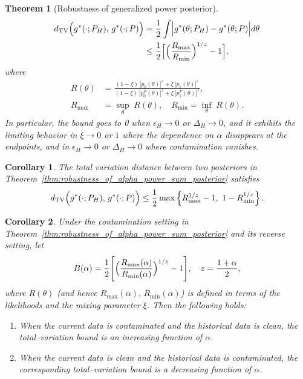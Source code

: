 \documentclass[12pt]{article}
\newtheorem{theorem}{Theorem}
\newtheorem{corollary}{Corollary}
\begin{document}
\begin{theorem}[Robustness of generalized power posterior]
    \begin{align*}
        d_{\mathrm{TV}}\Bigl(g^*(\cdot;P_H),\,g^*(\cdot;P)\Bigr) &= \frac{1}{2}\int\Bigl| g^*(\theta;P_H) - g^*(\theta;P) \Bigr| d\theta \nonumber \\
        &\leq \frac{1}{2}\Bigl[\Bigl(\frac{R_{\max}}{R_{\min}}\Bigr)^{1/z} - 1 \Bigr],
    \end{align*}
    where
    \begin{align*}
        R(\theta) &=  \frac{(1-\xi)\,\bigl[p_0(\theta)\bigr]^z + \xi\,\bigl[p_1(\theta)\bigr]^z}{(1-\xi)\,\bigl[p_0^F(\theta)\bigr]^z +  \xi\,\bigl[p_1^F(\theta)\bigr]^z}, \\
        R_{\max} &= \sup_{\theta}\;R(\theta), \quad R_{\min} = \inf_{\theta}\;R(\theta).
    \end{align*}
    In particular, the bound goes to 0 when $\epsilon_H\to0$ or $\Delta_H\to0$, and it exhibits the limiting behavior in $\xi\to0$ or $1$ where the dependence on $\alpha$ disappears at the endpoints, and in $\epsilon_H\to0$ or $\Delta_H\to0$ where contamination vanishes.
\end{theorem}
\begin{corollary}
    The total variation distance between two posteriors in Theorem~\ref{thm:robustness_of_alpha_power_sum_posterior} satisfies
    \begin{align*}
        d_{\mathrm{TV}}\Bigl(g^*(\cdot;P_H),\,g^*(\cdot;P)\Bigr) \leq \frac{1}{2}\max\left\{R_{\max}^{1/z} - 1,\ 1 - R_{\min}^{1/z}\right\}.
    \end{align*}
\end{corollary}
\begin{corollary}
    \label{cor:contamination_alpha}
    Under the contamination setting in Theorem~\ref{thm:robustness_of_alpha_power_sum_posterior} and its reverse setting, let
    \begin{align*}
        B(\alpha)=\frac{1}{2}\Biggl[\Bigl(\frac{R_{\max}(\alpha)}{R_{\min}(\alpha)}\Bigr)^{1/z}-1\Biggr],\quad z=\frac{1+\alpha}{2},
    \end{align*}
    where $R(\theta)$ (and hence $R_{\max}(\alpha),\,R_{\min}(\alpha)$) is defined in terms of the likelihoods and the mixing parameter $\xi$.
    Then the following holds:
    \begin{enumerate}
      \item[(i)]  When the current data is contaminated and the historical data is clean, the total--variation bound is an increasing function of $\alpha$.
      \item[(ii)] When the current data is clean and the historical data is contaminated, the corresponding total--variation bound is a decreasing function of $\alpha$.
    \end{enumerate}
\end{corollary}
\end{document}
